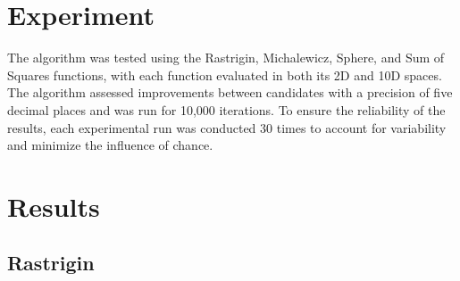 \documentclass{article}
\begin{document}
\section{Experiment}
The algorithm was tested using the Rastrigin, Michalewicz, Sphere, and Sum of Squares functions, with each function evaluated in both its 2D and 10D spaces. The algorithm assessed improvements between candidates with a precision of five decimal places and was run for 10,000 iterations. To ensure the reliability of the results, each experimental run was conducted 30 times to account for variability and minimize the influence of chance.

\section{Results}

\subsection{Rastrigin}
\end{document}
